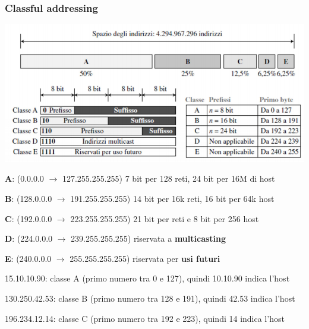 \documentclass[10pt]{article}
\begin{document}
\subsubsection{Classful addressing}
\begin{center}
\includegraphics[scale=0.65]{ipclassfuladdresing.png}
\end{center}
\begin{list}{Classe}{5 \textbf{classi di indirizzi} IP:}
\item \textbf{A}: (0.0.0.0 $\rightarrow$ 127.255.255.255) 7 bit per 128 reti, 24 bit per 16M di host 
\item \textbf{B}: (128.0.0.0 $\rightarrow$ 191.255.255.255) 14 bit per 16k reti, 16 bit per 64k host
\item \textbf{C}: (192.0.0.0 $\rightarrow$ 223.255.255.255) 21 bit per reti e 8 bit per 256 host 
\item \textbf{D}: (224.0.0.0 $\rightarrow$ 239.255.255.255) riservata a \textbf{multicasting} 
\item \textbf{E}: (240.0.0.0 $\rightarrow$ 255.255.255.255) riservata per \textbf{usi futuri} 
\end{list}
\begin{list}{}{}
\item 15.10.10.90: classe A (primo numero tra 0 e 127), quindi 10.10.90 indica l'host
\item 130.250.42.53: classe B (primo numero tra 128 e 191), quindi 42.53 indica l'host
\item 196.234.12.14: classe C (primo numero tra 192 e 223), quindi 14 indica l'host
\end{list}
\end{document}
